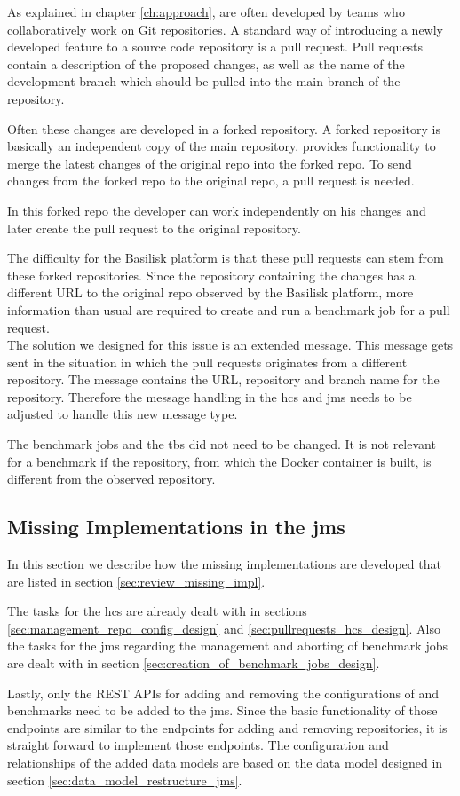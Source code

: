 As explained in chapter \ref{ch:approach}, \tsp{} are often developed by teams who collaboratively work on Git repositories.
A standard way of introducing a newly developed feature to a source code repository is a pull request.
Pull requests contain a description of the proposed changes, as well as the name of the development branch which should be pulled into the main branch of the repository.

Often these changes are developed in a forked repository.
A forked repository is basically an independent copy of the main repository.
\gh{} provides functionality to merge the latest changes of the original repo into the forked repo.
To send changes from the forked repo to the original repo, a pull request is needed.

In this forked repo the developer can work independently on his changes and later create the pull request to the original repository.

The difficulty for the Basilisk platform is that these pull requests can stem from these forked repositories.
Since the repository containing the changes has a different URL to the original repo observed by the Basilisk platform, more information than usual are required to create and run a benchmark job for a pull request.
\\

The solution we designed for this issue is an extended message.
This message gets sent in the situation in which the pull requests originates from a different repository.
The message contains the URL, repository and branch name for the \gh{} repository.
Therefore the message handling in the \ac{hcs} and \ac{jms} needs to be adjusted to handle this new message type.

The benchmark jobs and the \acl{tbs} did not need to be changed.
It is not relevant for a benchmark if the repository, from which the Docker container is built, is different from the observed repository.


\subsection{Missing Implementations in the \acl{jms}}
In this section we describe how the missing implementations are developed that are listed in section \ref{sec:review_missing_impl}.

The tasks for the \ac{hcs} are already dealt with in sections \ref{sec:management_repo_config_design} and \ref{sec:pullrequests_hcs_design}.
Also the tasks for the \ac{jms} regarding the management and aborting of benchmark jobs are dealt with in section \ref{sec:creation_of_benchmark_jobs_design}.

Lastly, only the REST APIs for adding and removing the configurations of \tsp{} and benchmarks need to be added to the \ac{jms}.
Since the basic functionality of those endpoints are similar to the endpoints for adding and removing repositories, it is straight forward to implement those endpoints.
The configuration and relationships of the added data models are based on the data model designed in section \ref{sec:data_model_restructure_jms}.



